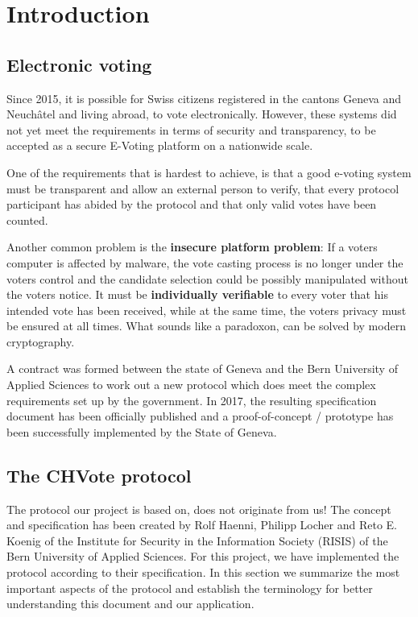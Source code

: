 \chapter{Introduction}
\section{Electronic voting}
Since 2015, it is possible for Swiss citizens registered in the cantons Geneva and Neuchâtel and living abroad, to vote electronically. However, these systems did not yet meet the requirements in terms of security and transparency, to be accepted as a secure E-Voting platform on a nationwide scale.

One of the requirements that is hardest to achieve, is that a good e-voting system must be transparent and allow an external person to verify, that every protocol participant has abided by the protocol and that only valid votes have been counted. 

Another common problem is the \textbf{insecure platform problem}: If a voters computer is affected by malware, the vote casting process is no longer under the voters control and the candidate selection could be possibly manipulated without the voters notice. It must be \textbf{individually verifiable} to every voter that his intended vote has been received, while at the same time, the voters privacy must be ensured at all times. What sounds like a paradoxon, can be solved by modern cryptography.

A contract was formed between the state of Geneva and the Bern University of Applied Sciences to work out a new protocol which does meet the complex requirements set up by the government. In 2017, the resulting specification document has been officially published and a proof-of-concept / prototype has been successfully implemented by the State of Geneva. 

\section{The CHVote protocol}
The protocol our project is based on, does not originate from us! The concept and specification has been created by Rolf Haenni, Philipp Locher and Reto E. Koenig of the Institute for Security in the Information Society (RISIS) of the Bern University of Applied Sciences. For this project, we have implemented the protocol according to their specification. In this section we summarize the most important aspects of the protocol and establish the terminology for better understanding this document and our application.


